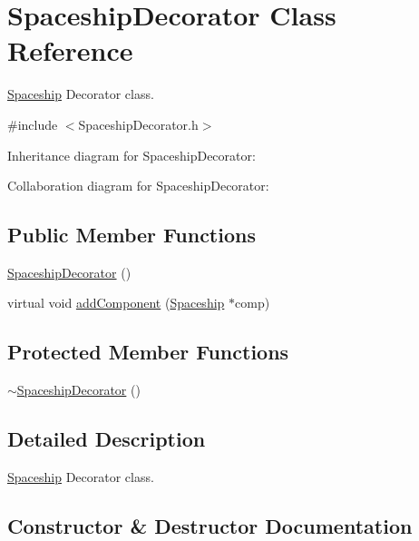 \hypertarget{classSpaceshipDecorator}{}\section{Spaceship\+Decorator Class Reference}
\label{classSpaceshipDecorator}


\hyperlink{classSpaceship}{Spaceship} Decorator class.  




{\ttfamily \#include $<$Spaceship\+Decorator.\+h$>$}



Inheritance diagram for Spaceship\+Decorator\+:


Collaboration diagram for Spaceship\+Decorator\+:
\subsection*{Public Member Functions}
\begin{DoxyCompactItemize}
\item 
\hyperlink{classSpaceshipDecorator_a7a3248a02147d6b5399cd6fac9f73ed4}{Spaceship\+Decorator} ()
\item 
virtual void \hyperlink{classSpaceshipDecorator_a08442441af1fa8979f1e411a5e7b511c}{add\+Component} (\hyperlink{classSpaceship}{Spaceship} $\ast$comp)
\end{DoxyCompactItemize}
\subsection*{Protected Member Functions}
\begin{DoxyCompactItemize}
\item 
\hyperlink{classSpaceshipDecorator_ad29c1235cbfe963e073fd63ea607bf35}{$\sim$\+Spaceship\+Decorator} ()
\end{DoxyCompactItemize}


\subsection{Detailed Description}
\hyperlink{classSpaceship}{Spaceship} Decorator class. 

\subsection{Constructor \& Destructor Documentation}
\mbox{\label{classSpaceshipDecorator_a7a3248a02147d6b5399cd6fac9f73ed4}} 

